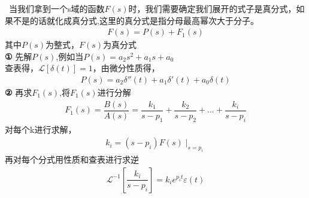 \documentclass[UTF8,a4paper,12pt]{ctexart}
\begin{document}
    \begin{flushleft}
      \begin{notitlebox}
         \ 当我们拿到一个s域的函数$F(s)$时，我们需要确定我们展开的式子是真分式，如果不是的话就化成真分式,这里的真分式是指分母最高幂次大于分子。
    \begin{align*}
      F(s)=P(s)+F_1(s)
    \end{align*}
    其中$P(s)$为整式，$F(s)$为真分式
   \\\textbf{①} 先解$P(s)$,例如当$P(s)=a_2s^2+a_1s+a_0$
    \\查表得，$\mathcal{L}[\delta(t)]=1$，由微分性质得，
    \begin{align*}
      P(s)=a_2 \delta''(t)+a_1\delta'(t)+a_0\delta(t)
    \end{align*}
   \textbf{②} 再求$F_1(s)$,将$F_1(s)$进行分解
      \begin{align*}
        F_1(s)=\dfrac{B(s)}{A(s)}=\dfrac{k_1}{s-p_1}+\dfrac{k_2}{s-p_2}+...+\dfrac{k_i}{s-p_i}
      \end{align*}
      对每个k进行求解，
      \begin{align*}
        k_i=(s-p_i)F(s)\mid_{s=p_i}^{}
      \end{align*}
      再对每个分式用性质和查表进行求逆
      \begin{align*}
        \mathcal{L}^{-1}[\dfrac{k_i}{s-p_i}]=k_ie^{p_it}\varepsilon (t)
      \end{align*}


\end{notitlebox}
\end{flushleft}
\end{document}
